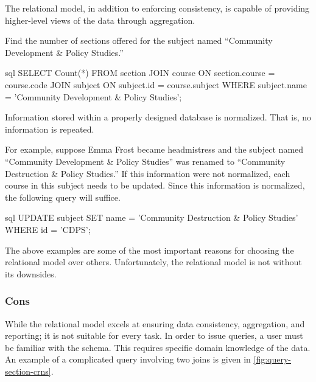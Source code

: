 			The relational model, in addition to enforcing consistency, is capable of providing higher-level views of the data through aggregation.
			
			\begin{ex}[Aggregation]
				Find the number of sections offered for the subject named ``Community Development \& Policy Studies.''
				
				\begin{singlespaced}
					\begin{pygments}{sql}
SELECT Count(*)
FROM   section
       JOIN course
         ON section.course = course.code
       JOIN subject
         ON subject.id = course.subject
WHERE  subject.name = 'Community Development & Policy Studies';
					\end{pygments}
				\end{singlespaced}
			\end{ex}
			
			Information stored within a properly designed database is normalized.  That is, no information is repeated.
			
			\begin{ex}[Normalization]
				For example, suppose Emma Frost became headmistress and the subject named ``Community Development \& Policy Studies'' was renamed to ``Community Destruction \& Policy Studies.''  If this information were not normalized, each course in this subject needs to be updated.  Since this information is normalized, the following query will suffice.
				
				\begin{singlespaced}
					\begin{pygments}{sql}
UPDATE subject
SET    name = 'Community Destruction & Policy Studies'
WHERE  id = 'CDPS';
					\end{pygments}
				\end{singlespaced}
			\end{ex}
			
			The above examples are some of the most important reasons for choosing the relational model over others.	Unfortunately, the relational model is not without its downsides.
		
		\subsubsection{Cons}
			While the relational model excels at ensuring data consistency, aggregation, and reporting; it is not suitable for every task.	In order to issue queries, a user must be familiar with the schema.	 This requires specific domain knowledge of the data.  An example of a complicated query involving two joins is given in \cref{fig:query-section-crns}.
			
